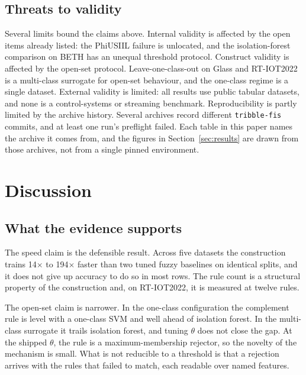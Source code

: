 \documentclass[journal]{IEEEtran}
\begin{document}
\subsection{Threats to validity}
Several limits bound the claims above. Internal validity is affected by the open items already listed: the PhiUSIIL failure is unlocated, and the isolation-forest comparison on BETH has an unequal threshold protocol. Construct validity is affected by the open-set protocol. Leave-one-class-out on Glass and RT-IOT2022 is a multi-class surrogate for open-set behaviour, and the one-class regime is a single dataset. External validity is limited: all results use public tabular datasets, and none is a control-systems or streaming benchmark. Reproducibility is partly limited by the archive history. Several archives record different \texttt{tribble-fis} commits, and at least one run's preflight failed. Each table in this paper names the archive it comes from, and the figures in Section~\ref{sec:results} are drawn from those archives, not from a single pinned environment.

\section{Discussion}
\label{sec:discussion}

\subsection{What the evidence supports}
The speed claim is the defensible result. Across five datasets the construction trains 14$\times$ to 194$\times$ faster than two tuned fuzzy baselines on identical splits, and it does not give up accuracy to do so in most rows. The rule count is a structural property of the construction and, on RT-IOT2022, it is measured at twelve rules.

The open-set claim is narrower. In the one-class configuration the complement rule is level with a one-class SVM and well ahead of isolation forest. In the multi-class surrogate it trails isolation forest, and tuning $\theta$ does not close the gap. At the shipped $\theta$, the rule is a maximum-membership rejector, so the novelty of the mechanism is small. What is not reducible to a threshold is that a rejection arrives with the rules that failed to match, each readable over named features.
\end{document}
